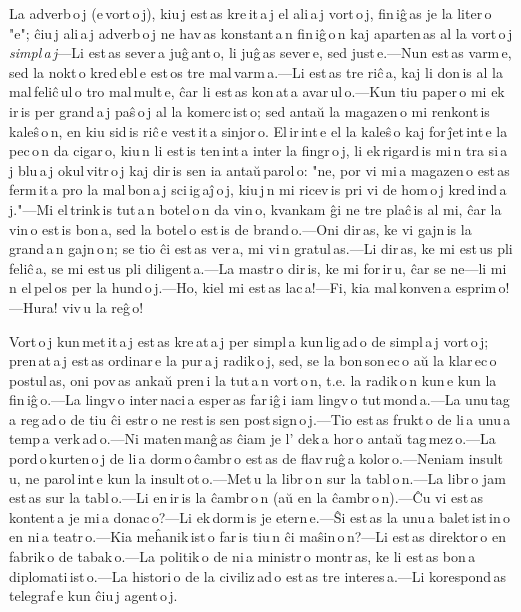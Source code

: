 \documentclass[ngerman,12pt,twoside]{book}
\begin{document}
\enlargethispage{-\baselineskip}

La adverb\,o\,j (e\,vort\,o\,j), kiu\,j est\,as kre\,it\,a\,j el ali\,a\,j vort\,o\,j, fin\,iĝ\,as je la liter\,o "e"; ĉiu\,j ali\,a\,j adverb\,o\,j ne hav\,as konstant\,a\,n fin\,iĝ\,o\,n kaj aparten\,as al la vort\,o\,j \emph{simpl\,a\,j}---Li est\,as sever\,a juĝ\,ant\,o, li juĝ\,as sever\,e, sed just\,e.---Nun est\,as varm\,e, sed la nokt\,o kred\,ebl\,e est\,os tre mal\,varm\,a.---Li est\,as tre riĉ\,a, kaj li don\,is al la mal\,feliĉ\,ul\,o tro mal\,mult\,e, ĉar li est\,as kon\,at\,a avar\,ul\,o.---Kun tiu paper\,o mi ek\,ir\,is per grand\,a\,j paŝ\,o\,j al la komerc\,ist\,o; sed antaŭ la magazen\,o mi renkont\,is kaleŝ\,o\,n, en kiu sid\,is riĉ\,e vest\,it\,a sinjor\,o. El\,ir\,int\,e el la kaleŝ\,o kaj for\,ĵet\,int\,e la pec\,o\,n da cigar\,o, kiu\,n li est\,is ten\,int\,a inter la fingr\,o\,j, li ek\,rigard\,is mi\,n tra si\,a\,j blu\,a\,j okul\,vitr\,o\,j kaj dir\,is sen ia antaŭ\,parol\,o: "ne, por vi mi\,a magazen\,o est\,as ferm\,it\,a pro la mal\,bon\,a\,j sci\,ig\,aĵ\,o\,j, kiu\,j\,n mi ricev\,is pri vi de hom\,o\,j kred\,ind\,a\,j."---Mi el\,trink\,is tut\,a\,n botel\,o\,n da vin\,o, kvankam ĝi ne tre plaĉ\,is al mi, ĉar la vin\,o est\,is bon\,a, sed la botel\,o est\,is de brand\,o.---Oni dir\,as, ke vi gajn\,is la grand\,a\,n gajn\,o\,n; se tio ĉi est\,as ver\,a, mi vi\,n gratul\,as.---Li dir\,as, ke mi est\,us pli feliĉ\,a, se mi est\,us pli diligent\,a.---La mastr\,o dir\,is, ke mi for\,ir\,u, ĉar se ne---li mi\,n el\,pel\,os per la hund\,o\,j.---Ho, kiel mi est\,as lac\,a!---Fi, kia mal\,konven\,a esprim\,o!---Hura! viv\,u la reĝ\,o! 



Vort\,o\,j kun\,met\,it\,a\,j est\,as kre\,at\,a\,j per simpl\,a kun\,lig\,ad\,o de simpl\,a\,j vort\,o\,j; pren\,at\,a\,j est\,as ordinar\,e la pur\,a\,j radik\,o\,j, sed, se la bon\,son\,ec\,o aŭ la klar\,ec\,o postul\,as, oni pov\,as ankaŭ pren\,i la tut\,a\,n vort\,o\,n, t.e. la radik\,o\,n kun\,e kun la fin\,iĝ\,o.---La lingv\,o inter\,naci\,a esper\,as far\,iĝ\,i iam lingv\,o tut\,mond\,a.---La unu\,tag\,a reg\,ad\,o de tiu ĉi estr\,o ne rest\,is sen post\,sign\,o\,j.---Tio est\,as frukt\,o de li\,a unu\,a\,temp\,a verk\,ad\,o.---Ni maten\,manĝ\,as ĉiam je l' dek\,a hor\,o antaŭ tag\,mez\,o.---La pord\,o\,kurten\,o\,j de li\,a dorm\,o\,ĉambr\,o est\,as de flav\,ruĝ\,a kolor\,o.---Neniam insult\,u, ne parol\,int\,e kun la insult\,ot\,o.---Met\,u la libr\,o\,n sur la tabl\,o\,n.---La libr\,o jam est\,as sur la tabl\,o.---Li en\,ir\,is la ĉambr\,o\,n (aŭ en la ĉambr\,o\,n).---Ĉu vi est\,as kontent\,a je mi\,a donac\,o?---Li ek\,dorm\,is je etern\,e.---Ŝi est\,as la unu\,a balet\,ist\,in\,o en ni\,a teatr\,o.---Kia meĥanik\,ist\,o far\,is tiu\,n ĉi maŝin\,o\,n?---Li est\,as direktor\,o en fabrik\,o de tabak\,o.---La politik\,o de ni\,a ministr\,o montr\,as, ke li est\,as bon\,a diplomati\,ist\,o.---La histori\,o de la civiliz\,ad\,o est\,as tre interes\,a.---Li korespond\,as telegraf\,e kun ĉiu\,j agent\,o\,j. 
\end{document}

